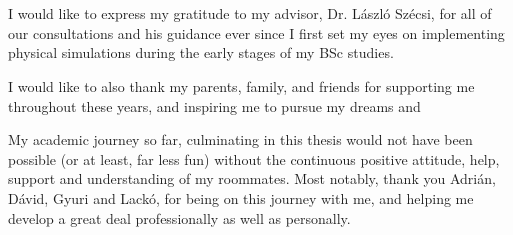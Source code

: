 \chapter*{\koszonetnyilvanitas}

I would like to express my gratitude to my advisor, Dr. László Szécsi, for all
of our consultations and his guidance ever since I first set my eyes on
implementing physical simulations during the early stages of my BSc studies.

I would like to also thank my parents, family, and friends for supporting me
throughout these years, and inspiring me to pursue my dreams and 

My academic journey so far, culminating in this thesis would not have been
possible (or at least, far less fun) without the continuous positive attitude,
help, support and understanding of my roommates. Most notably, thank you Adrián,
Dávid, Gyuri and Lackó, for being on this journey with me, and helping me
develop a great deal professionally as well as personally.
